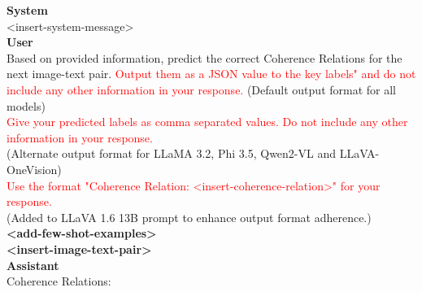 \begin{figure*}[t]
    \centering
    \begin{tcolorbox}[title={Zero/Few Shot Prompt for CLUE Multi-Label}, colframe = orange!30, colback = orange!10, coltitle = orange!20!black, after skip=0pt, boxsep=5pt, width=\textwidth]
    
    \textbf{System} \\
    <insert-system-message> \\
    
    \textbf{User} \\
    Based on provided information, predict the correct Coherence Relations for the next image-text pair. \textcolor{red}{Output them as a JSON value to the key labels" and do not include any other information in your response.} (Default output format for all models) \\

    \textcolor{red}{Give your predicted labels as comma separated values. Do not include any other information in your response.} \\ (Alternate output format for LLaMA 3.2, Phi 3.5, Qwen2-VL and LLaVA-OneVision) \\

    \textcolor{red}{Use the format "Coherence Relation: <insert-coherence-relation>" for your response.} \\
    (Added to LLaVA 1.6 13B prompt to enhance output format adherence.) \\
    
    \textbf{<add-few-shot-examples>} \\
    
    \textbf{<insert-image-text-pair>} \\
    
    \textbf{Assistant} \\
    Coherence Relations:
    
    \end{tcolorbox}
\end{figure*}

